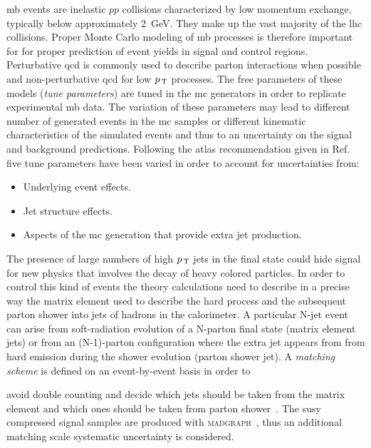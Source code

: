 \gls{mb} events are inelastic $pp$ collisions characterized by low momentum
exchange, typically below approximately 2~GeV. They make up the vast majority of
the \gls{lhc} collisions. Proper Monte Carlo modeling of \gls{mb} processes is
therefore important for for proper prediction of event yields in signal and
control regions. Perturbative \gls{qcd} is commonly used to describe parton
interactions when possible and non-perturbative \gls{qcd} for low $p_\mathrm{\, T}$
processes. The free parameters of these models (\emph{tune parameters}) are
tuned in the \gls{mc} generators in order to replicate experimental \gls{mb}
data. The variation of these parameters may lead to different number of
generated events in the \gls{mc} samples or different kinematic characteristics
of the simulated events and thus to an uncertainty on the signal and background
predictions. Following the \gls{atlas} recommendation given in
Ref.~\cite{MCTuningRecommendations2015} five tune parameters have been varied in
order to account for uncertainties from:
\begin{itemize}
\item Underlying event effects.
\item Jet structure effects.
\item Aspects of the \gls{mc} generation that provide extra jet production.
\end{itemize}

The presence of large numbers of high $p_\mathrm{\, T}$ jets in the final state could hide
signal for new physics that involves the decay of heavy colored particles. In
order to control this kind of events the theory calculations need to describe in
a precise way the matrix element used to describe the hard process and the
subsequent parton shower into jets of hadrons in the calorimeter. A particular
N-jet event can arise from soft-radiation evolution of a N-parton final state
(matrix element jets) or from an (N-1)-parton configuration where the extra jet
appears from from hard emission during the shower evolution (parton shower
jet). A \emph{matching scheme} is defined on an event-by-event basis in order to

avoid double counting and decide which jets should be taken from the matrix
element and which ones should be taken from parton shower~\cite{Matching}. The
\gls{susy} compressed signal samples are produced with
\textsc{madgraph}~\cite{MADGRAPH}, thus an additional matching scale systematic
uncertainty is considered. %



